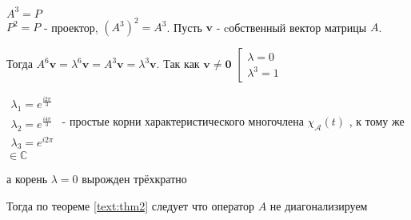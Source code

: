 \begin{solution}
	$ A^{3} = P $ \\
	$ P^2 = P $ - проектор,
	$ (A^3)^2 = A^3 $.
	Пусть $ \boldsymbol{v} $ - cобственный вектор матрицы $ A $.
	
	Тогда $ A^6 \boldsymbol{v} = \lambda^6 \boldsymbol{v} = A^{3} \boldsymbol{v} = \lambda^3 \boldsymbol{v}.$
	Так как $ \boldsymbol{v}\neq \boldsymbol{0} $
	$
	\left[\begin{array}{l}{\lambda=0} \\ {\lambda^{3}=1}\end{array}\right.
	$
	
	$
	\begin{array}{l}{\lambda_{1}=e^{\frac{i 2 \pi}{3}}} \\ {\lambda_{2}=e^{\frac{i 4 \pi}{3}}} \\ {\lambda_{3}=e^{i 2 \pi}}\end{array}
	$ - простые корни характеристического многочлена $\chi_{\mathcal{A}}(t)$ , к тому же $ \in \mathbb{C} $
	
	а корень $ \lambda = 0 $ вырожден трёхкратно
	
	Тогда по теореме \ref{text:thm2} следует что оператор $ A $ не диагонализируем
	
\end{solution}

				